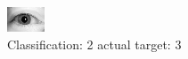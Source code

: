 \begin{figure}[h!]
\begin{center}
\includegraphics[width=0.60\columnwidth]{figures/ID3099_class_2_target_3.png}
\end{center}
\caption{ Classification: 2 actual target: 3}
\label{fig:ID3099_class_2_target_3}
\end{figure}
